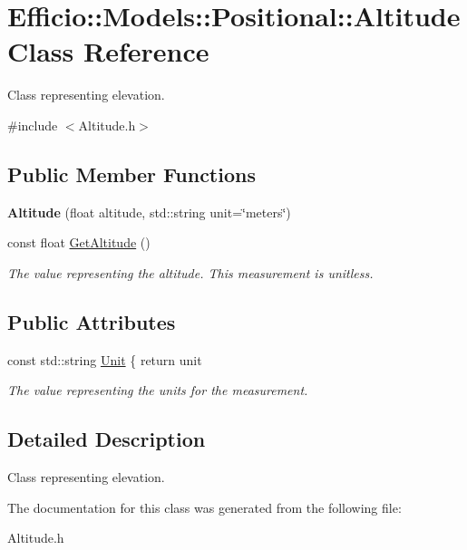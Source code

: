 \hypertarget{class_efficio_1_1_models_1_1_positional_1_1_altitude}{}\section{Efficio\+:\+:Models\+:\+:Positional\+:\+:Altitude Class Reference}
\label{class_efficio_1_1_models_1_1_positional_1_1_altitude}


Class representing elevation.  




{\ttfamily \#include $<$Altitude.\+h$>$}

\subsection*{Public Member Functions}
\begin{DoxyCompactItemize}
\item 
{\bfseries Altitude} (float altitude, std\+::string unit=\char`\"{}meters\char`\"{})\hypertarget{class_efficio_1_1_models_1_1_positional_1_1_altitude_a4c3b908f2392aac43e725d85d7c78857}{}\label{class_efficio_1_1_models_1_1_positional_1_1_altitude_a4c3b908f2392aac43e725d85d7c78857}

\item 
const float \hyperlink{class_efficio_1_1_models_1_1_positional_1_1_altitude_ad98c2ad63e922011931b90b9bcfa91be}{Get\+Altitude} ()\hypertarget{class_efficio_1_1_models_1_1_positional_1_1_altitude_ad98c2ad63e922011931b90b9bcfa91be}{}\label{class_efficio_1_1_models_1_1_positional_1_1_altitude_ad98c2ad63e922011931b90b9bcfa91be}

\begin{DoxyCompactList}\small\item\em The value representing the altitude. This measurement is unitless. \end{DoxyCompactList}\end{DoxyCompactItemize}
\subsection*{Public Attributes}
\begin{DoxyCompactItemize}
\item 
const std\+::string \hyperlink{class_efficio_1_1_models_1_1_positional_1_1_altitude_ade574481283e972e888994db99d0fda8}{Unit} \{ return unit\hypertarget{class_efficio_1_1_models_1_1_positional_1_1_altitude_ade574481283e972e888994db99d0fda8}{}\label{class_efficio_1_1_models_1_1_positional_1_1_altitude_ade574481283e972e888994db99d0fda8}

\begin{DoxyCompactList}\small\item\em The value representing the units for the measurement. \end{DoxyCompactList}\end{DoxyCompactItemize}


\subsection{Detailed Description}
Class representing elevation. 

The documentation for this class was generated from the following file\+:\begin{DoxyCompactItemize}
\item 
Altitude.\+h\end{DoxyCompactItemize}
